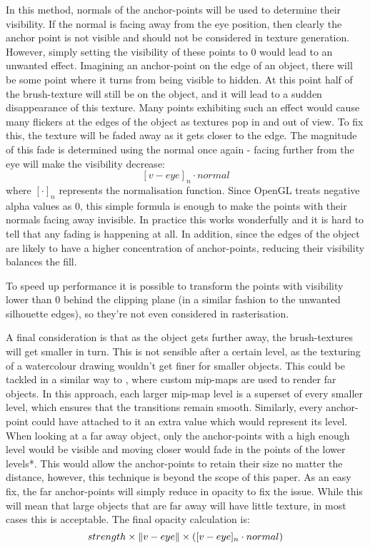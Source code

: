 \documentclass[a4paper, 12pt]{article}
\DeclarePairedDelimiter{\norm}{\lVert}{\rVert}
\begin{document}
In this method, normals of the anchor-points will be used to determine their visibility. If the normal is facing away from the eye position, then clearly the anchor point is not visible and should not be considered in texture generation. However, simply setting the visibility of these points to 0 would lead to an unwanted effect. Imagining an anchor-point on the edge of an object, there will be some point where it turns from being visible to hidden. At this point half of the brush-texture will still be on the object, and it will lead to a sudden disappearance of this texture. Many points exhibiting such an effect would cause many flickers at the edges of the object as textures pop in and out of view. To fix this, the texture will be faded away as it gets closer to the edge. The magnitude of this fade is determined using the normal once again - facing further from the eye will make the visibility decrease:
$$[v-eye]_n \cdot normal$$
where $[\cdot]_n$ represents the normalisation function. Since OpenGL treats negative alpha values as 0, this simple formula is enough to make the points with their normals facing away invisible. In practice this works wonderfully and it is hard to tell that any fading is happening at all. In addition, since the edges of the object are likely to have a higher concentration of anchor-points, reducing their visibility balances the fill.

To speed up performance it is possible to transform the points with visibility lower than 0 behind the clipping plane (in a similar fashion to the unwanted silhouette edges), so they're not even considered in rasterisation.

A final consideration is that as the object gets further away, the brush-textures will get smaller in turn. This is not sensible after a certain level, as the texturing of a watercolour drawing wouldn't get finer for smaller objects. This could be tackled in a similar way to \cite{Praun2001}, where custom mip-maps are used to render far objects. In this approach, each larger mip-map level is a superset of every smaller level, which ensures that the transitions remain smooth. Similarly, every anchor-point could have attached to it an extra value which would represent its level. When looking at a far away object, only the anchor-points with a high enough level would be visible and moving closer would fade in the points of the lower levels*. This would allow the anchor-points to retain their size no matter the distance, however, this technique is beyond the scope of this paper. As an easy fix, the far anchor-points will simply reduce in opacity to fix the issue. While this will mean that large objects that are far away will have little texture, in most cases this is acceptable. The final opacity calculation is:
$$strength \times \norm{v-eye} \times ([v-eye]_n \cdot normal)$$
\end{document}
